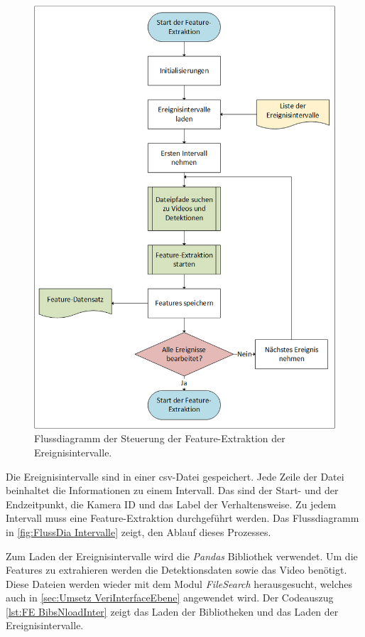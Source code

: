\begin{figure}[p]
    \centering
    \includegraphics[height=0.9\textheight]{img/Grafiken/Flussdiagramm Feature-Extraktion Start.png}
    \caption{Flussdiagramm der Steuerung der Feature-Extraktion der Ereignisintervalle.}
    \label{fig:FlussDia Intervalle}
\end{figure}

Die Ereignisintervalle sind in einer csv-Datei gespeichert. Jede Zeile der Datei beinhaltet die Informationen zu einem Intervall. Das sind der Start- und der Endzeitpunkt, die Kamera ID und das Label der Verhaltensweise. Zu jedem Intervall muss eine Feature-Extraktion durchgeführt werden. Das Flussdiagramm in \autoref{fig:FlussDia Intervalle} zeigt, den Ablauf dieses Prozesses. \par

Zum Laden der Ereignisintervalle wird die \textit{Pandas} Bibliothek verwendet. Um die Features zu extrahieren werden die Detektionsdaten sowie das Video benötigt. Diese Dateien werden wieder mit dem Modul \textit{FileSearch} herausgesucht, welches auch in \autoref{sec:Umsetz VeriInterfaceEbene} angewendet wird. Der Codeauszug \ref{lst:FE BibsNloadInter} zeigt das Laden der Bibliotheken und das Laden der Ereignisintervalle.\par


